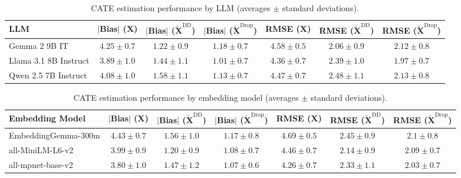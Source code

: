 \begin{table}[ht!]
    \raggedright
    \small
    \caption{CATE estimation performance by LLM (averages $\pm$ standard deviations).}
    \begin{sc}
    \begin{tabular}{lcccccc}
    \toprule
    \textbf{LLM} & \textbf{$|$Bias$|$ ($\mathbf{X}$)} & \textbf{$|$Bias$|$ ($\mathbf{\widetilde{X}}^{\textrm{DD}}$)} & \textbf{$|$Bias$|$ ($\mathbf{\widetilde{X}}^{\textrm{Drop}}$)} & \textbf{RMSE ($\mathbf{X}$)} & \textbf{RMSE ($\mathbf{\widetilde{X}}^{\textrm{DD}}$)} & \textbf{RMSE ($\mathbf{\widetilde{X}}^{\textrm{Drop}}$)}\\
    \midrule
    Gemma 2 9B IT & $4.25 \pm 0.7$ & $\mathbf{1.22 \pm 0.9}$ & $1.18 \pm 0.7$ & $4.58 \pm 0.5$ & $\mathbf{2.06 \pm 0.9}$ & $2.12 \pm 0.8$\\
    Llama 3.1 8B Instruct & $\mathbf{3.89 \pm 1.0}$ & $1.44 \pm 1.1$ & $\mathbf{1.01 \pm 0.7}$ & $\mathbf{4.36 \pm 0.7}$ & $2.39 \pm 1.0$ & $\mathbf{1.97 \pm 0.7}$\\
    Qwen 2.5 7B Instruct & $4.08 \pm 1.0$ & $1.58 \pm 1.1$ & $1.13 \pm 0.7$ & $4.47 \pm 0.7$ & $2.48 \pm 1.1$ & $2.13 \pm 0.8$\\
    \bottomrule
    \end{tabular}
    \end{sc}
\end{table}

    \begin{table}[ht!]
    \raggedright
    \small
    \caption{CATE estimation performance by embedding model (averages $\pm$ standard deviations).}
    \begin{sc}
    \begin{tabular}{lcccccc}
    \toprule
    \textbf{Embedding Model} & \textbf{$|$Bias$|$ ($\mathbf{X}$)} & \textbf{$|$Bias$|$ ($\mathbf{\widetilde{X}}^{\textrm{DD}}$)} & \textbf{$|$Bias$|$ ($\mathbf{\widetilde{X}}^{\textrm{Drop}}$)} & \textbf{RMSE ($\mathbf{X}$)} & \textbf{RMSE ($\mathbf{\widetilde{X}}^{\textrm{DD}}$)} & \textbf{RMSE ($\mathbf{\widetilde{X}}^{\textrm{Drop}}$)}\\
    \midrule
    EmbeddingGemma-300m & $4.43 \pm 0.7$ & $1.56 \pm 1.0$ & $1.17 \pm 0.8$ & $4.69 \pm 0.5$ & $2.45 \pm 0.9$ & $2.1 \pm 0.8$\\
    all-MiniLM-L6-v2 & $3.99 \pm 0.9$ & $\mathbf{1.20 \pm 0.9}$ & $1.08 \pm 0.7$ & $4.46 \pm 0.7$ & $\mathbf{2.14 \pm 0.9}$ & $2.09 \pm 0.7$\\
    all-mpnet-base-v2 & $\mathbf{3.80 \pm 1.0}$ & $1.47 \pm 1.2$ & $\mathbf{1.07 \pm 0.6}$ & $\mathbf{4.26 \pm 0.7}$ & $2.33 \pm 1.1$ & $\mathbf{2.03 \pm 0.7}$\\
    \bottomrule
    \end{tabular}
    \end{sc}
    \end{table}

